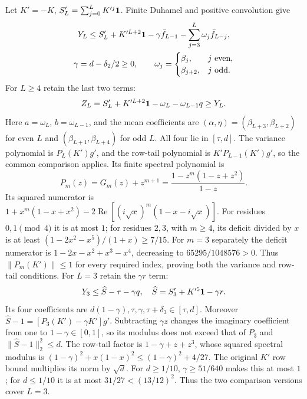Let $K'=-K$, $S'_L=\sum_{j=0}^LK'^j\mathbf1$.
Finite Duhamel and positive convolution give
\begin{gather*}
 Y_L\le S'_L+K'^{L+2}\mathbf1-\gamma \bar f_{L-1}
                         -\sum_{j=3}^L\omega_j\bar f_{L-j},\\
 \gamma=d-\delta_{2}/2\ge0,\qquad
 \omega_j=\begin{cases}\beta_j,&j\text{ even},\\\beta_{j+2},&j\text{ odd}.
 \end{cases}
\end{gather*}
For $L\ge4$ retain the last two terms:
\[
 Z_L=S'_L+K'^{L+2}\mathbf1-\omega_L-\omega_{L-1}q\ge Y_L.
\]
Here $a=\omega_L$, $b=\omega_{L-1}$, and the mean coefficients are
$(\alpha,\eta)=(\beta_{L+3},\beta_{L+2})$ for even $L$ and
$(\beta_{L+1},\beta_{L+4})$ for odd $L$.
All four lie in $[\tau,d]$. The variance polynomial is $P_L(K')g'$,
and the row-tail polynomial is $K'P_{L-1}(K')g'$, so the common
comparison applies.
Its finite spectral polynomial is
\[
 P_m(z)=G_m(z)+z^{m+1}=\frac{1-z^m(1-z+z^2)}{1-z}.
\]
Its squared numerator is
$1+x^m(1-x+x^2)-2\operatorname{Re}[(i\sqrt x)^m(1-x-i\sqrt x)]$.
For residues $0,1\pmod4$ it is at most $1$; for residues $2,3$,
with $m\ge4$, its deficit divided by $x$ is at least
$(1-2x^2-x^5)/(1+x)\ge7/15$.
For $m=3$ separately the deficit numerator is
$1-2x-x^2+x^3-x^4$, decreasing to $65295/1048576>0$.
Thus $\|P_m(K')\|\le1$ for every required index, proving both the
variance and row-tail conditions.
For $L=3$ retain the $\gamma r$ term:
\[
 Y_3\le\widehat S-\tau-\gamma q,\quad
 \widehat S=S'_3+K'^5\mathbf1-\gamma r.
\]
Its four coefficients are $d(1-\gamma),\tau,\gamma,\tau+\delta_{3}\in[\tau,d]$.
Moreover $\widehat S-1=[P_3(K')-\gamma K']g'$.
Subtracting $\gamma z$ changes the imaginary coefficient from one to
$1-\gamma\in[0,1]$, so its modulus does not exceed that of $P_3$ and
$\|\widehat S-1\|_2^2\le d$.
The row-tail factor is $1-\gamma+z+z^3$, whose squared spectral modulus
is $(1-\gamma)^2+x(1-x)^2\le(1-\gamma)^2+4/27$.
The original $K'$ row bound multiplies its norm by $\sqrt d$.
For $d\ge1/10$, $\gamma\ge51/640$ makes this at most $1$;
for $d\le1/10$ it is at most $31/27<(13/12)^2$.
Thus the two comparison versions cover $L=3$.

